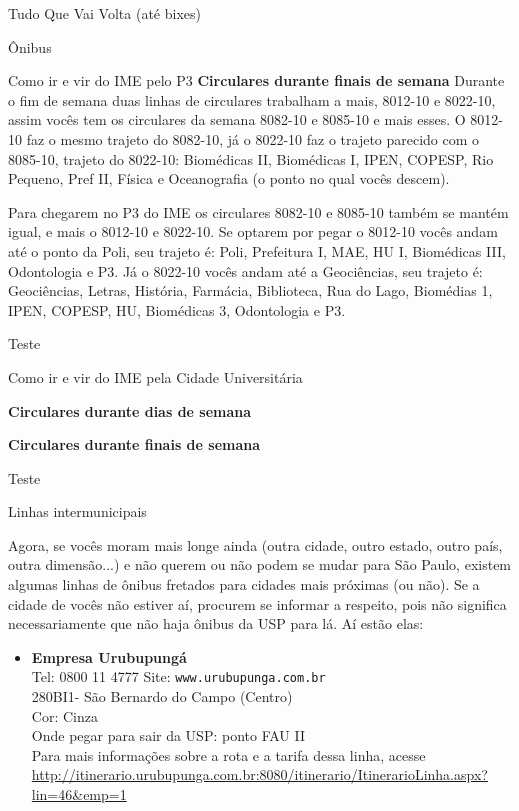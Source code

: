 \begin{secao}{Tudo Que Vai Volta (até bixes)}
\begin{subsecao}{Ônibus}
\begin{subsubsecao}{Como ir e vir do IME pelo P3}
{\bf Circulares durante finais de semana}
Durante o fim de semana duas linhas de circulares trabalham a mais, 8012-10 e 8022-10,
assim vocês tem os circulares da semana 8082-10 e 8085-10 e mais esses.
O 8012-10 faz o mesmo trajeto do 8082-10, já o 8022-10 faz o trajeto parecido com
o 8085-10, trajeto do 8022-10: Biomédicas II, Biomédicas I, IPEN, COPESP, Rio 
Pequeno, Pref II, Física e Oceanografia (o ponto no qual vocês descem).

Para chegarem no P3 do IME os circulares 8082-10 e 8085-10 também se mantém igual, 
e mais o 8012-10 e 8022-10. Se optarem por pegar o 8012-10 vocês andam até o ponto da Poli, 
seu trajeto é: Poli, Prefeitura I, MAE, HU I, Biomédicas III, Odontologia e P3. Já o 8022-10 
vocês andam até a Geociências, seu trajeto é: Geociências, Letras, História, Farmácia, 
Biblioteca, Rua do Lago, Biomédias 1, IPEN, COPESP, HU, Biomédicas 3, Odontologia e P3.

Teste

\end{subsubsecao}

\begin{subsubsecao}{Como ir e vir do IME pela Cidade Universitária}

{\bf Circulares durante dias de semana}

{\bf Circulares durante finais de semana}

Teste

\end{subsubsecao}

\begin{subsubsecao}{Linhas intermunicipais}

Agora, se vocês moram mais longe ainda (outra cidade, outro estado, outro país,
outra dimensão...) e não querem ou não podem se mudar para São Paulo, existem
algumas linhas de ônibus fretados para cidades mais próximas (ou não). Se a
cidade de vocês não estiver aí, procurem se informar a respeito, pois não
significa necessariamente que não haja ônibus da USP para lá. Aí estão elas:

\begin{itemize}
  \item {\bf Empresa Urubupungá}\\
    Tel: 0800 11 4777
    Site: {\tt www.urubupunga.com.br}\\
    280BI1- São Bernardo do Campo (Centro)\\
    Cor: Cinza\\
    Onde pegar para sair da USP: ponto FAU II\\
    Para mais informações sobre a rota e a tarifa dessa linha, acesse
    \url{http://itinerario.urubupunga.com.br:8080/itinerario/ItinerarioLinha.aspx?lin=46\&emp=1}


\end{itemize}
\end{subsubsecao}
\end{subsecao}
\end{secao}
